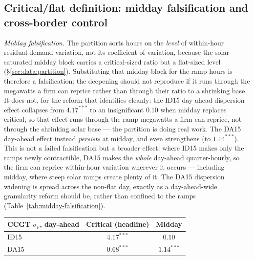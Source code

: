 \documentclass[11pt,a4paper]{article}
\theoremstyle{definition}
\theoremstyle{remark}
\theoremstyle{plain}
\begin{document}
\subsection{Critical/flat definition: midday falsification and cross-border control}\label{sec:5a}

\emph{Midday falsification.} The partition sorts hours on the \emph{level} of within-hour residual-demand variation, not its coefficient of variation, because the solar-saturated midday block carries a critical-sized ratio but a flat-sized level (\S\ref{sec:data:partition}). Substituting that midday block for the ramp hours is therefore a falsification: the deepening should not reproduce if it runs through the megawatts a firm can reprice rather than through their ratio to a shrinking base. It does not, for the reform that identifies cleanly: the ID15 day-ahead dispersion effect collapses from $\mathbf{4.17}^{***}$ to an insignificant $0.10$ when midday replaces critical, so that effect runs through the ramp megawatts a firm can reprice, not through the shrinking solar base --- the partition is doing real work. The DA15 day-ahead effect instead \emph{persists} at midday, and even strengthens (to $\mathbf{1.14}^{***}$). This is not a failed falsification but a broader effect: where ID15 makes only the ramps newly contractible, DA15 makes the \emph{whole} day-ahead quarter-hourly, so the firm can reprice within-hour variation wherever it occurs --- including midday, where steep solar ramps create plenty of it. The DA15 dispersion widening is spread across the non-flat day, exactly as a day-ahead-wide granularity reform should be, rather than confined to the ramps (Table~\ref{tab:midday-falsification}).

\begin{center}
\footnotesize
\setlength{\tabcolsep}{10pt}
\begin{tabular}{l c c}
\toprule
\textbf{CCGT $\sigma_p$, day-ahead} & \textbf{Critical (headline)} & \textbf{Midday} \\
\midrule
ID15 & $\mathbf{4.17}^{***}$ & $0.10$ \\
DA15 & $\mathbf{0.68}^{***}$ & $\mathbf{1.14}^{***}$ \\
\bottomrule
\end{tabular}
\label{tab:midday-falsification}
\end{center}
\end{document}

